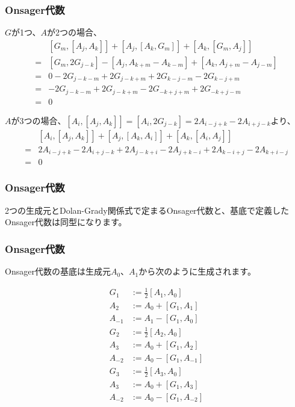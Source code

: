 \documentclass{beamer}
\begin{document}
\begin{frame}
    \frametitle{Onsager代数}

    $G$が1つ、$A$が2つの場合、
    \begin{align}
            & [G_m,[A_j,A_k]]+[A_j,[A_k,G_m]]+[A_k,[G_m,A_j]]            \\
        ={} & [G_m,2G_{j-k}]-[A_j,A_{k+m}-A_{k-m}]+[A_k,A_{j+m}-A_{j-m}] \\
        ={} & 0-2G_{j-k-m}+2G_{j-k+m}+2G_{k-j-m}-2G_{k-j+m}              \\
        ={} & -2G_{j-k-m}+2G_{j-k+m}-2G_{-k+j+m}+2G_{-k+j-m}             \\
        ={} & 0
    \end{align}

    $A$が3つの場合、$[A_i,[A_j,A_k]]=[A_i,2G_{j-k}]=2A_{i-j+k}-2A_{i+j-k}$より、
    \begin{align}
            & [A_i,[A_j,A_k]]+[A_j,[A_k,A_i]]+[A_k,[A_i,A_j]]                   \\
        ={} & 2A_{i-j+k}-2A_{i+j-k}+2A_{j-k+i}-2A_{j+k-i}+2A_{k-i+j}-2A_{k+i-j} \\
        ={} & 0
    \end{align}
\end{frame}

\begin{frame}
    \frametitle{Onsager代数}

    \begin{theorem}[Onsager代数の同型]
        2つの生成元とDolan-Grady関係式で定まるOnsager代数と、基底で定義したOnsager代数は同型になります。
    \end{theorem}
\end{frame}

\begin{frame}
    \frametitle{Onsager代数}

    Onsager代数の基底は生成元$A_0$、$A_1$から次のように生成されます。

    \begin{align}
        G_1    & := \frac{1}{2}[A_1,A_0] \\
        A_2    & := A_0+[G_1,A_1]        \\
        A_{-1} & := A_1-[G_1,A_0]        \\
        G_2    & := \frac{1}{2}[A_2,A_0] \\
        A_3    & := A_0+[G_1,A_2]        \\
        A_{-2} & := A_0-[G_1,A_{-1}]     \\
        G_3    & := \frac{1}{2}[A_3,A_0] \\
        A_3    & := A_0+[G_1,A_3]        \\
        A_{-2} & := A_0-[G_1,A_{-2}]
    \end{align}
\end{frame}
\end{document}
